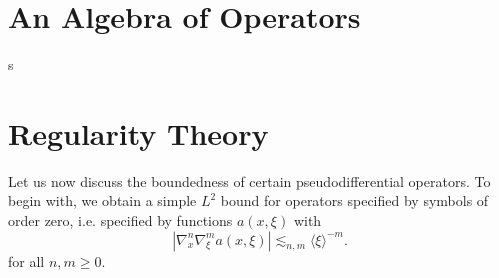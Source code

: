 \section{An Algebra of Operators}

s



\section{Regularity Theory}

Let us now discuss the boundedness of certain pseudodifferential operators. To begin with, we obtain a simple $L^2$ bound for operators specified by symbols of order zero, i.e. specified by functions $a(x,\xi)$ with
%
\[ | \nabla^n_x \nabla^m_\xi a(x,\xi)| \lesssim_{n,m} \langle \xi \rangle^{-m}. \]
%
for all $n,m \geq 0$.

